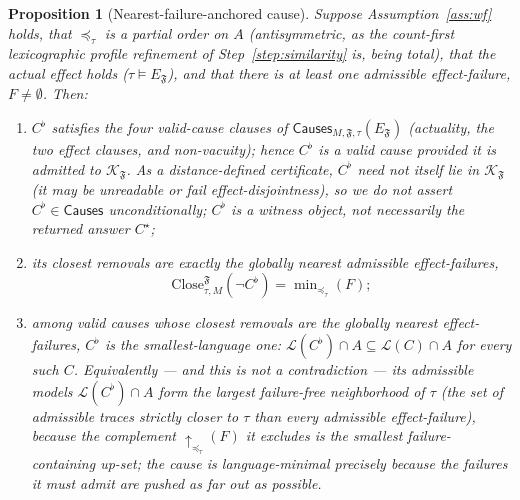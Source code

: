 \documentclass[11pt]{article}
\newtheorem{proposition}{Proposition}
\theoremstyle{remark}
\newcommand{\Close}{\mathrm{Close}}
\newcommand{\Lang}{\mathcal{L}}
\newcommand{\Frame}{\mathfrak{F}}
\begin{document}
\begin{proposition}[Nearest-failure-anchored cause]
\label{prop:weakest}
Suppose Assumption~\ref{ass:wf} holds, that \(\preceq_\tau\) is a partial order
on \(A\) (antisymmetric, as the count-first lexicographic profile refinement of
Step~\ref{step:similarity} is, being total), that the actual effect holds
(\(\tau\models E_{\Frame}\)), and that there is at least one admissible
effect-failure, \(F\neq\emptyset\). Then:
\begin{enumerate}[label=(\alph*)]
  \item \(C^{\flat}\) satisfies the four valid-cause clauses of
        \(\mathsf{Causes}_{M,\Frame,\tau}(E_{\Frame})\) (actuality, the two effect
        clauses, and non-vacuity); hence \(C^{\flat}\) is a valid cause
        \emph{provided it is admitted to} \(\mathcal{K}_{\Frame}\). As a
        distance-defined certificate, \(C^{\flat}\) need not itself lie in
        \(\mathcal{K}_{\Frame}\) (it may be unreadable or fail effect-disjointness),
        so we do \emph{not} assert \(C^{\flat}\in\mathsf{Causes}\) unconditionally;
        \(C^{\flat}\) is a witness object, not necessarily the returned answer
        \(C^{\star}\);
  \item its closest removals are exactly the globally nearest admissible
        effect-failures,
        \[
          \Close_{\tau,M}^{\Frame}(\neg C^{\flat})
          =\min\nolimits_{\preceq_\tau}(F);
        \]
  \item among valid causes whose closest removals are the globally nearest
        effect-failures, \(C^{\flat}\) is the \emph{smallest-language} one:
        \(\Lang(C^{\flat})\cap A\subseteq\Lang(C)\cap A\) for every such \(C\).
        Equivalently --- and this is not a contradiction --- its admissible models
        \(\Lang(C^{\flat})\cap A\) form the \emph{largest} failure-free
        neighborhood of \(\tau\) (the set of admissible traces strictly closer to
        \(\tau\) than every admissible effect-failure), because the complement
        \(\uparrow_{\preceq_\tau}(F)\) it excludes is the \emph{smallest}
        failure-containing up-set; the cause is language-minimal precisely because
        the failures it must admit are pushed as far out as possible.
\end{enumerate}
\end{proposition}
\end{document}
